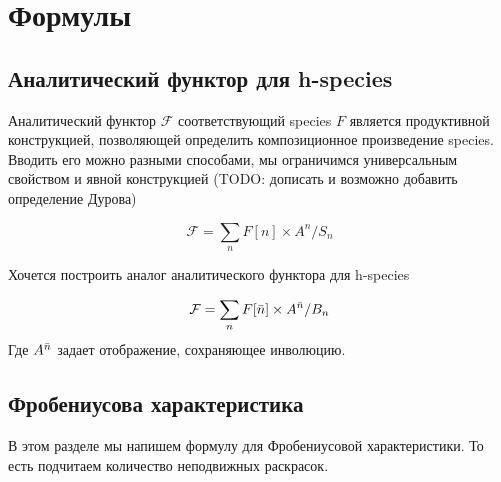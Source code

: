 \section{Формулы}

\subsection{Аналитический функтор для h-species}
Аналитический функтор $\mathcal F$ соответствующий species $F$ является
продуктивной конструкцией, позволяющей определить композиционное произведение
species. Вводить его можно разными способами, мы ограничимся универсальным
свойством и явной конструкцией (TODO: дописать и возможно добавить определение
Дурова)


\begin{equation}
\label{eq:an}
	\mathcal F = \sum\limits_n F[n] \times A^n / S_n
\end{equation}

Хочется построить аналог аналитического функтора для h-species


\begin{equation}
\label{eq:h-an}
	\mathcal F = \sum\limits_n F[\Bar n] \times A^{\Bar n} / B_n
\end{equation}
Где $A^{\Bar n}$ задает отображение, сохраняющее инволюцию. 

\subsection{Фробениусова характеристика}

В этом разделе мы напишем формулу для Фробениусовой характеристики.
То есть подчитаем количество неподвижных раскрасок.

